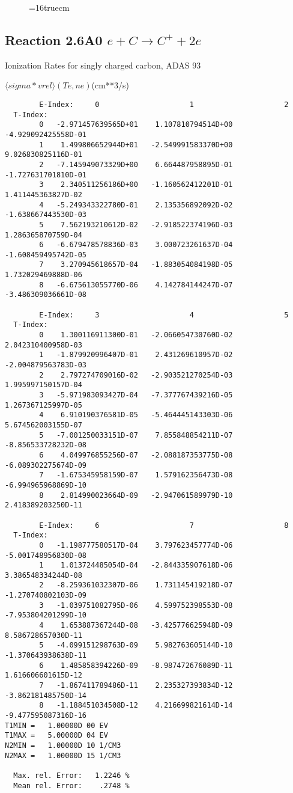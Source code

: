 \documentclass[12pt,dvipdfmx]{article}
\begin{document}
\begin{figure} \label{2.2C}
\epsfxsize=16truecm
\end{figure}
\newpage


\subsection{
Reaction 2.6A0 $e + C \rightarrow C^+  + 2e $
}
  Ionization Rates for singly charged carbon,
  ADAS 93

$  \langle sigma*vrel \rangle(Te,ne) $(cm**3/s)
\begin{small}\begin{verbatim}
        E-Index:     0                     1                     2
  T-Index:
        0   -2.971457639565D+01    1.107810794514D+00   -4.929092425558D-01
        1    1.499806652944D+01   -2.549991583370D+00    9.026830825116D-01
        2   -7.145949073329D+00    6.664487958895D-01   -1.727631701810D-01
        3    2.340511256186D+00   -1.160562412201D-01    1.411445363827D-02
        4   -5.249343322780D-01    2.135356892092D-02   -1.638667443530D-03
        5    7.562193210612D-02   -2.918522374196D-03    1.286365870759D-04
        6   -6.679478578836D-03    3.000723261637D-04   -1.608459495742D-05
        7    3.270945618657D-04   -1.883054084198D-05    1.732029469888D-06
        8   -6.675613055770D-06    4.142784144247D-07   -3.486309036661D-08

        E-Index:     3                     4                     5
  T-Index:
        0    1.300116911300D-01   -2.066054730760D-02    2.042310400958D-03
        1   -1.879920996407D-01    2.431269610957D-02   -2.004879563783D-03
        2    2.797274709016D-02   -2.903521270254D-03    1.995997150157D-04
        3   -5.971983093427D-04   -7.377767439216D-05    1.267367125997D-05
        4    6.910190376581D-05   -5.464445143303D-06    5.674562003155D-07
        5   -7.001250033151D-07    7.855848854211D-07   -8.856533728232D-08
        6    4.049976855256D-07   -2.088187353775D-08   -6.089302275674D-09
        7   -1.675345958159D-07    1.579162356473D-08   -6.994965968869D-10
        8    2.814990023664D-09   -2.947061589979D-10    2.418389203250D-11

        E-Index:     6                     7                     8
  T-Index:
        0   -1.198777580517D-04    3.797623457774D-06   -5.001748956830D-08
        1    1.013724485054D-04   -2.844335907618D-06    3.386548334244D-08
        2   -8.259361032307D-06    1.731145419218D-07   -1.270740802103D-09
        3   -1.039751082795D-06    4.599752398553D-08   -7.953804201299D-10
        4    1.653887367244D-08   -3.425776625948D-09    8.586728657030D-11
        5   -4.099151298763D-09    5.982763605144D-10   -1.370643938638D-11
        6    1.485858394226D-09   -8.987472676089D-11    1.616606601615D-12
        7   -1.867411789486D-11    2.235327393834D-12   -3.862181485750D-14
        8   -1.188451034508D-12    4.216699821614D-14   -9.477595087316D-16
T1MIN =   1.00000D 00 EV
T1MAX =   5.00000D 04 EV
N2MIN =   1.00000D 10 1/CM3
N2MAX =   1.00000D 15 1/CM3

  Max. rel. Error:   1.2246 %
  Mean rel. Error:    .2748 %
\end{verbatim}\end{small}
\end{document}
